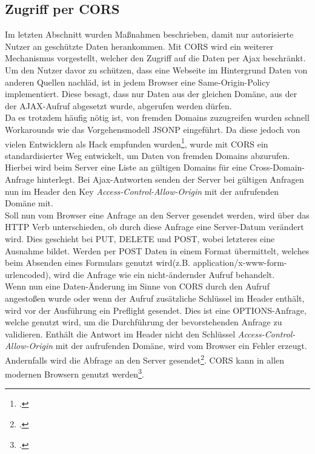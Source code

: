 \subsection{Zugriff per CORS}
\label{ssec:cors}
Im letzten Abschnitt wurden Maßnahmen beschrieben, damit nur autorisierte Nutzer an geschützte Daten herankommen. Mit \ac{CORS} wird ein weiterer Mechanismus vorgestellt, welcher den Zugriff auf die Daten per \ac{Ajax} beschränkt. \\
Um den Nutzer davor zu schützen, dass eine Webseite im Hintergrund Daten von anderen Quellen nachläd, ist in jedem Browser eine \ac{Same-Origin-Policy} implementiert. Diese besagt, dass nur Daten aus der gleichen Domäne, aus der der AJAX-Aufruf abgesetzt wurde, abgerufen werden dürfen. \\
Da es trotzdem häufig nötig ist, von fremden Domains zuzugreifen wurden schnell Workarounds wie das Vorgehensmodell \ac{JSONP} eingeführt. Da diese jedoch von vielen Entwicklern als Hack empfunden wurden\footcite[S. 102]{book:AngularJs:Steyer2015}, wurde mit CORS ein standardisierter Weg entwickelt, um Daten von fremden Domains abzurufen. Hierbei wird beim Server eine Liste an gültigen Domains für eine Cross-Domain-Anfrage hinterlegt. Bei Ajax-Antworten senden der Server bei gültigen Anfragen nun im Header den Key \textit{Access-Control-Allow-Origin} mit der aufrufenden Domäne mit. \\
Soll nun vom Browser eine Anfrage an den Server gesendet werden, wird über das HTTP Verb unterschieden, ob durch diese Anfrage eine Server-Datum verändert wird. Dies geschieht bei PUT, DELETE und POST, wobei letzteres eine Ausnahme bildet. Werden per POST Daten in einem Format übermittelt, welches beim Absenden eines Formulars genutzt wird(z.B. application/x-www-form-urlencoded), wird die Anfrage wie ein nicht-ändernder Aufruf behandelt. \\
Wenn nun eine Daten-Änderung im Sinne von CORS durch den Aufruf angestoßen wurde oder wenn der Aufruf zusätzliche Schlüssel im Header enthält, wird vor der Ausführung ein \ac{Preflight} gesendet. Dies ist eine OPTIONS-Anfrage, welche genutzt wird, um die Durchführung der bevorstehenden Anfrage zu validieren.
Enthält die Antwort im Header nicht den Schlüssel \textit{Access-Control-Allow-Origin} mit der aufrufenden Domäne, wird vom Browser ein Fehler erzeugt. Andernfalls wird die Abfrage an den Server gesendet\footcite[S. 102]{book:AngularJs:Steyer2015}. CORS kann in allen modernen Browsern genutzt werden\footcite{online:can-i-use:cors}.